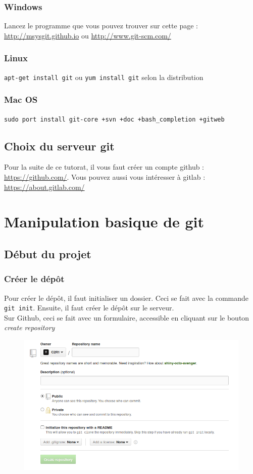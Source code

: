 \documentclass[a4paper,10pt]{report}
\begin{document}
    \subsection{Windows}
Lancez le programme que vous pouvez trouver sur cette page : \url{http://msysgit.github.io} ou \url{http://www.git-scm.com/}
    \subsection{Linux}
\verb|apt-get install git| ou \verb|yum install git| selon la distribution
    \subsection{Mac OS}
\verb|sudo port install git-core +svn +doc +bash_completion +gitweb|
  \section{Choix du serveur git}
Pour la suite de ce tutorat, il vous faut créer un compte github : \url{https://github.com/}.
Vous pouvez aussi vous intéresser à gitlab : \url{https://about.gitlab.com/}

\chapter{Manipulation basique de git}
  \section{D\'ebut du projet}
    \subsection{Cr\'eer le d\'ep\^ot}
Pour cr\'eer le d\'ep\^ot, il faut initialiser un dossier. Ceci se fait avec la commande \verb|git init|. Ensuite, il faut cr\'eer le d\'ep\^ot sur le serveur.\\
Sur Github, ceci se fait avec un formulaire, accessible en cliquant sur le bouton \emph{create repository}
\begin{figure}
 \includegraphics[scale=0.5]{images/createRepoForm}
\end{figure}
\end{document}
